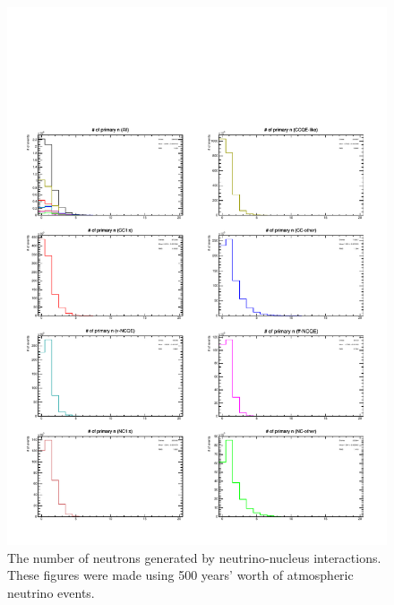 \begin{figure}[h]
	\centering
	\includegraphics[width=16cm]{PDF/NEUT/s1_2_official/neutron/NumPri}
	\caption[The number of neutrons generated by neutrino-nucleus interactions]{
	The number of neutrons generated by neutrino-nucleus interactions.
	These figures were made using 500 years' worth of atmospheric neutrino events.
	}\label{neutronNumPri}
\end{figure}

